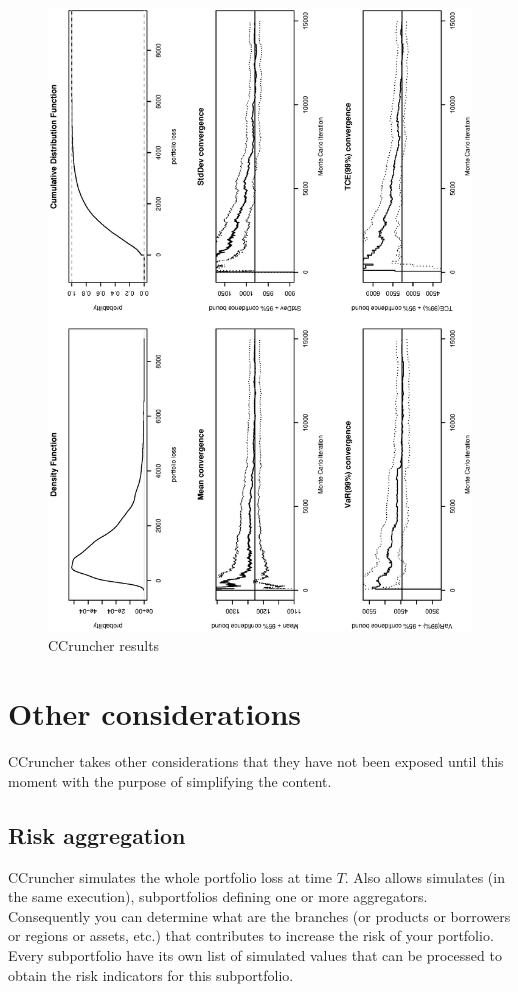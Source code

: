 \documentclass[a4paper,12pt,final]{article}
\begin{document}
\begin{figure}[p]
\begin{center}
\includegraphics[width=12cm,angle=0]{./images/report.eps}
\caption{CCruncher results}
\label{report}
\end{center}
\end{figure}


\section{Other considerations}
CCruncher takes other considerations that they have not been exposed
until this moment with the purpose of simplifying the content.

\subsection{Risk aggregation}
CCruncher simulates the whole portfolio loss at time $T$. Also allows simulates 
(in the same execution), subportfolios defining one or more aggregators. 
Consequently you can determine what are the branches (or products or borrowers 
or regions or assets, etc.) that contributes to increase the risk of your portfolio.
Every subportfolio have its own list of simulated values that can be processed
to obtain the risk indicators for this subportfolio.
\end{document}
